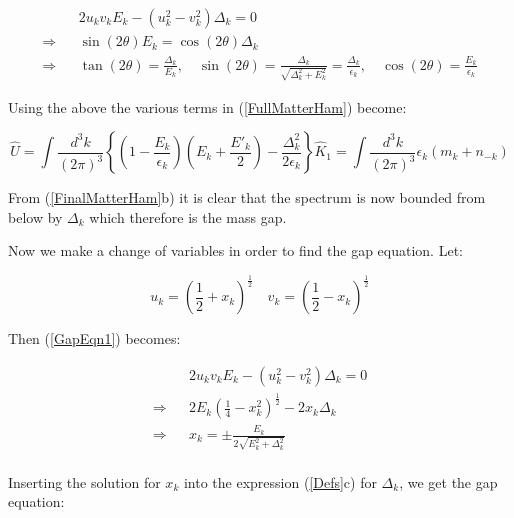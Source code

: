 \begin{doublespace}
\begin{eqnarray}\label{GapEqn1}
    &&2 u_k v_k E_k - (u_k^2 - v_k^2)\Delta_k = 0 \\
    \Rightarrow && \sin(2\theta) E_k = \cos(2\theta) \Delta_k \nonumber \\
    \Rightarrow && \tan(2\theta) = \frac{\Delta_k}{E_k}, \quad
    \sin(2\theta) = \frac{\Delta_k}{\sqrt{\Delta^2_k + E^2_k}} = \frac{\Delta_k}{\epsilon_k}, \quad
    \cos(2\theta) = \frac{E_k}{\epsilon_k}
\end{eqnarray}

Using the above the various terms in (\ref{FullMatterHam}) become:

\begin{subequations}\label{FinalMatterHam}
 \begin{equation}\label{PotentialEnergy}
   \hat U =  \int \frac{d^3k}{(2\pi)^3} \left\{ \left(1 - \frac{E_k}{\epsilon_k}\right)\left(E_k + \frac{E'_k}{2}\right) - \frac{\Delta_k^2}{2 \epsilon_k}  \right\}
\end{equation}
\begin{equation}
    \hat K_1 =  \int \frac{d^3k}{(2\pi)^3} \epsilon_k(m_k + n_{-k})
\end{equation}
\end{subequations}

From (\ref{FinalMatterHam}b) it is clear that the spectrum is now bounded from below by $\Delta_k$
which therefore is the mass gap.


Now we make a change of variables in order to find the gap equation. Let:

\begin{equation}
    u_k = (\frac{1}{2} + x_k)^\frac{1}{2} \quad v_k = (\frac{1}{2} - x_k)^\frac{1}{2}
\end{equation}

Then (\ref{GapEqn1}) becomes:

\begin{eqnarray}
    && 2 u_k v_k E_k - (u_k^2 - v_k^2)\Delta_k = 0 \nonumber \\
    \Rightarrow && 2E_k(\frac{1}{4} - x_k^2)^\frac{1}{2} - 2x_k \Delta_k \nonumber \\
    \Rightarrow && x_k = \pm\frac{E_k}{2\sqrt{E_k^2 + \Delta_k^2}} \nonumber \\
 \end{eqnarray}

Inserting the solution for $x_k$ into the expression (\ref{Defs}c) for $\Delta_k$, we get the gap
equation:


\end{doublespace}
